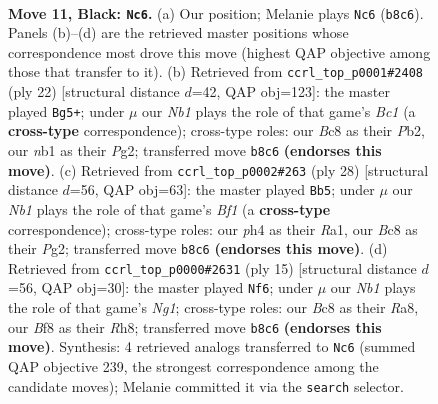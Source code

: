 \documentclass[11pt]{article}
\begin{document}
\clearpage

\begin{figure}[p]\centering
\begin{subfigure}{0.46\textwidth}\centering
\resizebox{\linewidth}{!}{%
\newchessgame
\chessboard[
  setfen={rnb1kb1r/1p3ppp/4pn2/p1P3N1/2B4P/4P3/PP3P2/RNBR2K1 b kq - 0 11},
  showmover=false,
  pgfstyle=straightmove, color=movearrow, markmove={b8-c6}
]}
\caption{}
\end{subfigure}\hfill
\begin{subfigure}{0.46\textwidth}\centering
\resizebox{\linewidth}{!}{%
\newchessgame
\chessboard[
  setfen={rnbk3r/5ppp/p3p3/1pb1P3/6n1/2N2N2/PP3PPP/R1B1KB1R w KQ - 0 12},
  showmover=false,
  pgfstyle=straightmove, color=movearrow, markmove={c1-g5}
]}
\caption{}
\end{subfigure}
\\[4pt]
\begin{subfigure}{0.46\textwidth}\centering
\resizebox{\linewidth}{!}{%
\newchessgame
\chessboard[
  setfen={r3k2r/pp1n1pp1/4b2p/2b1P3/7P/P4N2/1P3PP1/R1B1KB1R w KQkq - 0 15},
  showmover=false,
  pgfstyle=straightmove, color=movearrow, markmove={f1-b5}
]}
\caption{}
\end{subfigure}\hfill
\begin{subfigure}{0.46\textwidth}\centering
\resizebox{\linewidth}{!}{%
\newchessgame
\chessboard[
  setfen={r1bk2nr/ppp2ppp/3b4/1N2n3/4P3/8/PPP3PP/R1B1KBNR b KQ - 1 8},
  showmover=false,
  pgfstyle=straightmove, color=movearrow, markmove={g8-f6}
]}
\caption{}
\end{subfigure}
\caption{\textbf{Move 11, Black: \texttt{Nc6}.} (a) Our position; Melanie plays \texttt{Nc6} (\texttt{b8c6}). Panels (b)--(d) are the retrieved master positions whose correspondence most drove this move (highest QAP objective among those that transfer to it). (b) Retrieved from \texttt{ccrl\_top\_p0001\#2408} (ply 22) [structural distance $d$=42, QAP obj=123]: the master played \texttt{Bg5+}; under $\mu$ our \emph{Nb1} plays the role of that game's \emph{Bc1} (a \textbf{cross-type} correspondence); cross-type roles: our \emph{B}c8 as their \emph{P}b2, our \emph{n}b1 as their \emph{P}g2; transferred move \texttt{b8c6} \textbf{(endorses this move)}. (c) Retrieved from \texttt{ccrl\_top\_p0002\#263} (ply 28) [structural distance $d$=56, QAP obj=63]: the master played \texttt{Bb5}; under $\mu$ our \emph{Nb1} plays the role of that game's \emph{Bf1} (a \textbf{cross-type} correspondence); cross-type roles: our \emph{p}h4 as their \emph{R}a1, our \emph{B}c8 as their \emph{P}g2; transferred move \texttt{b8c6} \textbf{(endorses this move)}. (d) Retrieved from \texttt{ccrl\_top\_p0000\#2631} (ply 15) [structural distance $d$=56, QAP obj=30]: the master played \texttt{Nf6}; under $\mu$ our \emph{Nb1} plays the role of that game's \emph{Ng1}; cross-type roles: our \emph{B}c8 as their \emph{R}a8, our \emph{B}f8 as their \emph{R}h8; transferred move \texttt{b8c6} \textbf{(endorses this move)}. Synthesis: 4 retrieved analogs transferred to \texttt{Nc6} (summed QAP objective 239, the strongest correspondence among the candidate moves); Melanie committed it via the \texttt{search} selector.}
\label{fig:thought-m21}
\end{figure}
\end{document}

